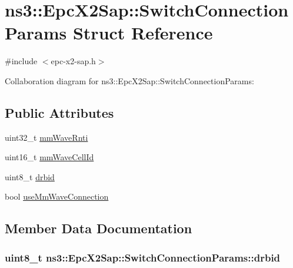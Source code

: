\hypertarget{structns3_1_1EpcX2Sap_1_1SwitchConnectionParams}{}\section{ns3\+:\+:Epc\+X2\+Sap\+:\+:Switch\+Connection\+Params Struct Reference}
\label{structns3_1_1EpcX2Sap_1_1SwitchConnectionParams}


{\ttfamily \#include $<$epc-\/x2-\/sap.\+h$>$}



Collaboration diagram for ns3\+:\+:Epc\+X2\+Sap\+:\+:Switch\+Connection\+Params\+:
\subsection*{Public Attributes}
\begin{DoxyCompactItemize}
\item 
uint32\+\_\+t \hyperlink{structns3_1_1EpcX2Sap_1_1SwitchConnectionParams_a431a9f7abb000bef3bb4ff02b80e486f}{mm\+Wave\+Rnti}
\item 
uint16\+\_\+t \hyperlink{structns3_1_1EpcX2Sap_1_1SwitchConnectionParams_a45d3a6cc4d1512fe8aa0a494fdbf8927}{mm\+Wave\+Cell\+Id}
\item 
uint8\+\_\+t \hyperlink{structns3_1_1EpcX2Sap_1_1SwitchConnectionParams_adab1f5c14432a789264ad264cddbda03}{drbid}
\item 
bool \hyperlink{structns3_1_1EpcX2Sap_1_1SwitchConnectionParams_a6c23932e8305d6f7e691043675e0b19b}{use\+Mm\+Wave\+Connection}
\end{DoxyCompactItemize}


\subsection{Member Data Documentation}
\subsubsection[{\texorpdfstring{drbid}{drbid}}]{\setlength{\rightskip}{0pt plus 5cm}uint8\+\_\+t ns3\+::\+Epc\+X2\+Sap\+::\+Switch\+Connection\+Params\+::drbid}\hypertarget{structns3_1_1EpcX2Sap_1_1SwitchConnectionParams_adab1f5c14432a789264ad264cddbda03}{}\label{structns3_1_1EpcX2Sap_1_1SwitchConnectionParams_adab1f5c14432a789264ad264cddbda03}
